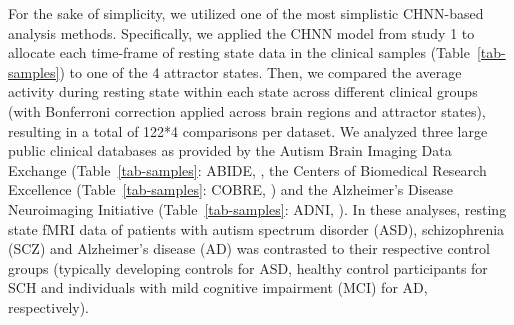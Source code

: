 \documentclass{article}
\begin{document}
For the sake of simplicity, we utilized one of the most simplistic CHNN-based analysis methods. Specifically, we applied the CHNN model from study 1 to allocate each time-frame of resting state data in the clinical samples (Table~\ref{tab-samples}) to one of the 4 attractor states. Then, we compared the average activity during resting state within each state across different clinical groups (with Bonferroni correction applied across brain regions and attractor states), resulting in a total of 122*4 comparisons per dataset. We analyzed three large public clinical databases as provided by the Autism Brain Imaging Data Exchange
(Table~\ref{tab-samples}: ABIDE, \citep{di2014autism}, the Centers of Biomedical Research Excellence
(Table~\ref{tab-samples}: COBRE, \citep{aine2017multimodal}) and the Alzheimer's Disease Neuroimaging Initiative
(Table~\ref{tab-samples}: ADNI, \citep{petersen2010alzheimer}).
In these analyses, resting state fMRI data of patients with autism spectrum disorder (ASD), schizophrenia (SCZ) and Alzheimer's disease
(AD) was contrasted to their respective control groups (typically developing controls for ASD, healthy control
participants for SCH and individuals with mild cognitive impairment (MCI) for AD, respectively).
\end{document}
